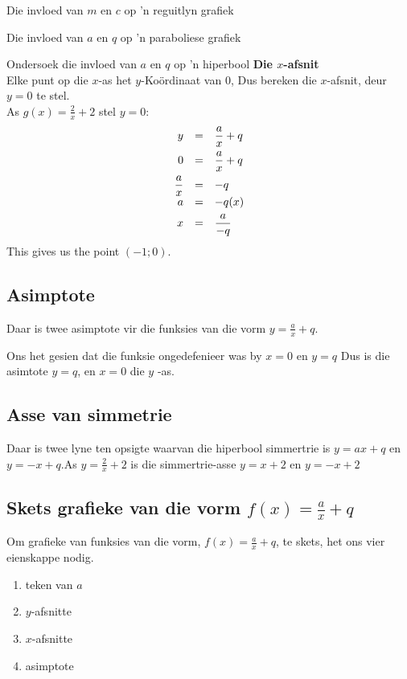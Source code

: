 \begin{Ondersoek}{Die invloed van $m$ en $c$ op 'n reguitlyn grafiek}
\begin{Ondersoek}{Die invloed van $a$ en $q$ op 'n paraboliese grafiek}
\begin{Ondersoek}{Ondersoek die invloed van $a$ en $q$ op 'n hiperbool}
\textbf{Die $x$-afsnit} \\
Elke punt op die $x$-as het $y$-Ko\"ordinaat van $0$, Dus bereken die $x$-afsnit, deur $y=0$ te stel.\\
As $g(x)=\frac{2}{x}+2$ stel $y=0$:
\begin{equation*}
\begin{array}{ccl}
\hfill y& =& \dfrac{a}{x}+q\hfill \vspace{4pt}\\
 \hfill 0& =& \dfrac{a}{x}+q\hfill \vspace{4pt} \\
 \hfill \dfrac{a}{x}& =& -q\hfill \\
 \hfill a& =& -q(x)\hfill \vspace{4pt}\\
 \hfill x& =& \dfrac{a}{-q}\hfill 
\end{array}
\end{equation*}
This gives us the point $(-1; 0)$.


\subsection*{Asimptote}

Daar is twee asimptote vir die funksies van die vorm $y=\frac{a}{x}+q$. \par 
Ons het gesien dat die funksie ongedefenieer was by $x=0$ en $y=q$ Dus is die asimtote $y=q$, en $x=0$ die $y$ -as. 

\subsection*{Asse van simmetrie}
Daar is twee lyne ten opsigte waarvan die hiperbool simmertrie is $y=ax+q$ en $y = -x +q$.As $y = \frac{2}{x} + 2$ is die simmertrie-asse $y = x + 2$ en $y = -x + 2$


\subsection*{Skets grafieke van die vorm  $f(x)=\frac{a}{x}+q$}

Om grafieke van funksies van die vorm, $f(x)=\frac{a}{x}+q$, te skets, het ons vier eienskappe nodig.
\begin{enumerate}[noitemsep, label=\textbf{\arabic*}. ] 
\item teken van $a$
\item $y$-afsnitte
\item $x$-afsnitte
\item asimptote
\end{enumerate}


\end{Ondersoek}
\end{Ondersoek}
\end{Ondersoek}
